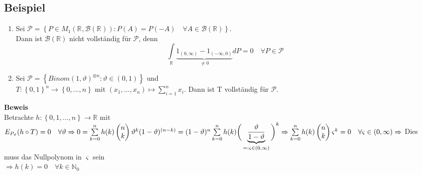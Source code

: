 \documentclass[german,10pt,oneside, fleqn, a4paper]{article}
\newcommand {\R}	{\mathbb{R}}
\newcommand {\N}	{\mathbb{N}}
\newcommand{\Ra}	{\Rightarrow}
\newcommand{\ra}{\rightarrow}
\newcommand{\sm}[2][\infty]{\sum\limits_{#2}^{#1}}
\newcommand{\brc}[1]{\left(#1\right)}
\newcommand{\brac}[1]{\left\lbrace #1\right\rbrace}
\newcommand{\mat}[1]{\begin{pmatrix}#1\end{pmatrix}}
\newcommand{\mc}[1]{\mathcal{#1}}
\newcommand{\beweis}{\textbf{Beweis}\\}
\newcommand{\1}[1]{1_{#1}}
\newcommand{\2}[1]{\1{\brac{#1}}}
\newcommand{\rbor}[1][d]{\brc{\R^{#1},\mc{B}\brc{\R^{#1}}}}
\newcommand{\intr}{\int\limits_\R}
\newcommand{\stuff}{{\otimes n}}
\begin{document}
\subsection{Beispiel}
\label{11.7}\begin{enumerate}[label=(\alph*)]
\item Sei $\mc{P}=\brac{P\in M_1\rbor[]:P(A)=P(-A)\quad\forall A\in\mc{B}(\R)}$.\\
Dann ist $\mc{B}(\R)$ nicht vollständig für $\mc{P}$, denn \[
\intr \underbrace{1_{(0,\infty)}-1_{(-\infty,0)}}_{\neq0}dP=0\quad\forall P\in\mc{P}\]
\item Sei $\mc{P}=\brac{Binom(1,\vartheta)^\stuff:\vartheta\in(0,1)}$ und \\
$T:\brac{0,1}^n\ra\brac{0,...,n}$ mit $(x_1,...,x_n)\mapsto\sm[n]{i=1}x_i$. Dann ist T vollständig für $\mc{P}$.
\end{enumerate}
\beweis
Betrachte $h:\brac{0,1,...,n}\ra\R$ mit $E_{P_\vartheta}(h\circ T)=0\quad\forall \vartheta\\
\Ra 0=\sm[n]{k=0}h(k)\mat{n\\k}\vartheta^k(1-\vartheta)^{(n-k)}\\
= (1-\vartheta)^n\sm[n]{k=0}h(k)\bigg(\underbrace{\dfrac{\vartheta}{1-\vartheta}}_{=:\varsigma\in(0,\infty)}\bigg)^k\\
\Ra\sm[n]{k=0}h(k)\mat{n\\k}\varsigma^k=0\quad\forall\varsigma\in(0,\infty)\\
\Ra$ Dies muss das Nullpolynom in $\varsigma$ sein\\
$\Ra h(k)=0\quad \forall k\in\N_0$
\end{document}
